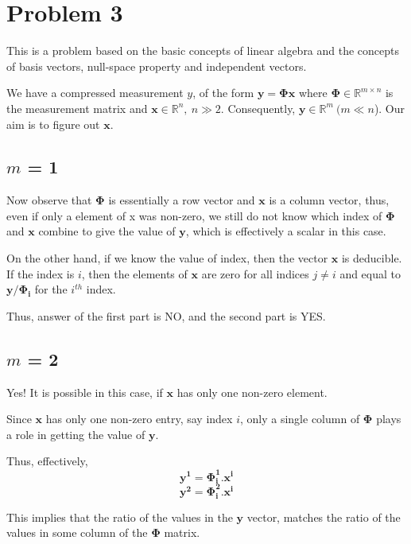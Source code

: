 \documentclass[a4paper,11pt]{article}
\numberwithin{definition}{section}
\numberwithin{mytheorem}{subsection}
\begin{document}
\section{Problem 3}

This is a problem based on the basic concepts of linear algebra and the concepts of basis vectors, null-space property and independent vectors.

We have a compressed measurement $y$, of the form $\boldsymbol{y} = \boldsymbol{\Phi x}$ where $\boldsymbol{\Phi} \in \mathbb{R}^{m \times n}$ is the measurement matrix and $\boldsymbol{x} \in \mathbb{R}^n, ~n \gg 2$. Consequently, $\boldsymbol{y} \in \mathbb{R}^m ~(m \ll n$). Our aim is to figure out $\boldsymbol{x}$.

\subsection{$m$ = 1}
Now observe that $\boldsymbol{\Phi}$ is essentially a row vector and $\boldsymbol{x}$ is a column vector, thus, even if only a element of x was non-zero, we still do not know which index of $\boldsymbol{\Phi}$ and $\boldsymbol{x}$ combine to give the value of $\boldsymbol{y}$, which is effectively a scalar in this case.

On the other hand, if we know the value of index, then the vector $\boldsymbol{x}$ is deducible. If the index is $i$, then the elements of $\boldsymbol{x}$ are zero for all indices $j\neq i$ and equal to $\boldsymbol{y/\Phi_i}$ for the $i^{th}$ index.

Thus, answer of the first part is NO, and the second part is YES.

\subsection{$m$ = 2}

Yes! It is possible in this case, if $\boldsymbol{x}$ has only one non-zero element.

Since $\boldsymbol{x}$ has only one non-zero entry, say index $i$, only a single column of $\boldsymbol{\Phi}$ plays a role in getting the value of $\boldsymbol{y}$.

Thus, effectively,
$$\boldsymbol{y^1} = \boldsymbol{\Phi_i^1.x^i}$$
$$\boldsymbol{y^2} = \boldsymbol{\Phi_i^2.x^i}$$

This implies that the ratio of the values in the $\boldsymbol{y}$ vector, matches the ratio of the values in some column of the $\boldsymbol{\Phi}$ matrix.
\end{document}
